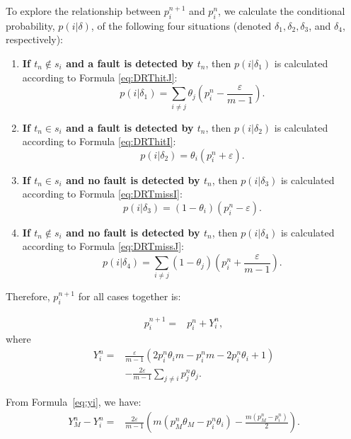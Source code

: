 \documentclass[10pt,journal,compsoc]{IEEEtran}
\begin{document}
To explore the relationship between $p_i^{n + 1}$ and $p_i^{n}$, we calculate the conditional probability, $p(i|\delta)$, of the following four situations (denoted $\delta_1, \delta_2, \delta_3$, and $\delta_4$, respectively):

\begin{enumerate}
  \item
  \textbf{If $t_{n} \notin s_i$ and a fault is detected by $t_n$}, then $p(i|\delta_1)$ is calculated according to Formula \ref{eq:DRThitJ}:
    $$p(i|\delta_1) = \sum_{i \neq j}\theta_j(p_i^n - \displaystyle\frac{\varepsilon}{m - 1}).$$

  \item
  \textbf{If $t_{n} \in s_i$ and a fault is detected by $t_n$}, then $p(i|\delta_2)$ is calculated according to Formula \ref{eq:DRThitI}:
    $$p(i|\delta_2) = \theta_i(p_i^n + \varepsilon).$$

  \item
  \textbf{If $t_{n} \in s_i$ and no fault is detected by $t_n$}, then $p(i|\delta_3)$ is calculated according to Formula \ref{eq:DRTmissI}:
    $$p(i|\delta_3) = (1 - \theta_i)(p_i^n - \varepsilon).$$

  \item
  \textbf{If $t_{n} \notin s_i$ and no fault is detected by $t_n$}, then $p(i|\delta_4)$ is calculated according to Formula \ref{eq:DRTmissJ}:
    $$p(i|\delta_4) = \sum_{i \neq j}(1 - \theta_j)(p_i^n + \displaystyle\frac{\varepsilon}{m - 1}).$$
\end{enumerate}

Therefore, $p_i^{n + 1}$ for all cases together is:

\begin{equation}
    \label{eq:7}
    \begin{split}
    p_i^{n + 1}
    =&p_i^n + Y_i^n,
    \end{split}
\end{equation}
where
\begin{equation}
    \begin{split}
    \label{eq:yi}
    Y_i^n = &\displaystyle\frac{\varepsilon}{m - 1}(2p_i^n\theta_im - p_i^nm - 2p_i^n\theta_i + 1 )\\
             &- \displaystyle\frac{2\varepsilon}{m-1}\sum_{j \neq i}p_j^n\theta_j.
    \end{split}
 \end{equation}

From Formula~\ref{eq:yi}, we have:
 \begin{equation}
    \begin{split}
    \label{eq:26}
    Y_M^n - Y_i^n
    =&\displaystyle\frac{2\varepsilon}{m - 1}(m(p_M^n\theta_M - p_i^n\theta_i) - \displaystyle\frac{m(p_M^n - p_i^n)}{2}).
    \end{split}
\end{equation}
\end{document}
